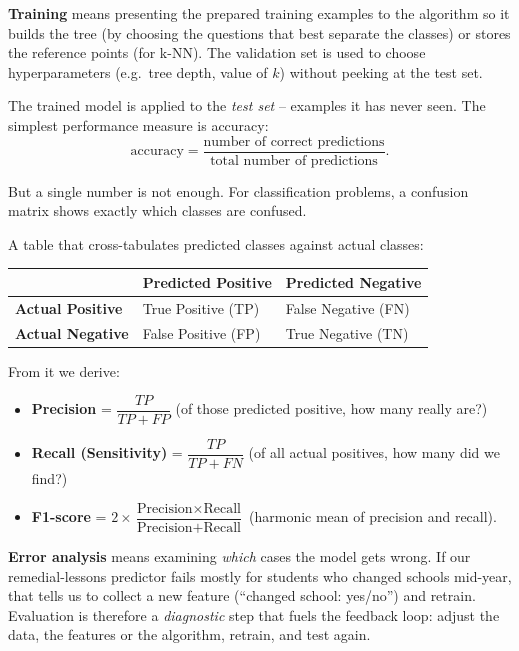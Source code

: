 \documentclass[11pt]{article}
\newcommand{\cle}[1]{{\popxbold\color{popdark}#1}}
\newcounter{popsec}
\newcounter{popsub}
\newcommand{\courssub}[1]{%
  \stepcounter{popsub}%
  \par\vspace{9pt}\noindent{\popxbold\fontsize{11.5}{13}\selectfont\color{popink}{\color{poporange}\thepopsec.\thepopsub}\hspace{6pt}#1}\par\nopagebreak\vspace{4pt}
}
\begin{document}
\textbf{Training} means presenting the prepared training examples to the algorithm so it builds the tree (by choosing the questions that best separate the classes) or stores the reference points (for k-NN). The validation set is used to choose hyperparameters (e.g.\ tree depth, value of $k$) without peeking at the test set.

\courssub{Stage 6: Testing and Evaluation}

The trained model is applied to the \emph{test set} -- examples it has never seen. The simplest performance measure is \cle{accuracy}:
\[ \text{accuracy} = \frac{\text{number of correct predictions}}{\text{total number of predictions}}. \]

But a single number is not enough. For classification problems, a \cle{confusion matrix} shows exactly which classes are confused.

\begin{definition}
A table that cross-tabulates predicted classes against actual classes:
\begin{center}
\begin{tabularx}{\linewidth}{|l|X|X|}
\hline
\rowcolor{popblueL} & \textbf{Predicted Positive} & \textbf{Predicted Negative} \\
\hline
\textbf{Actual Positive} & True Positive (TP) & False Negative (FN) \\
\hline
\textbf{Actual Negative} & False Positive (FP) & True Negative (TN) \\
\hline
\end{tabularx}
\end{center}
From it we derive:
\begin{itemize}
\item \textbf{Precision} = $\dfrac{TP}{TP+FP}$ (of those predicted positive, how many really are?)
\item \textbf{Recall (Sensitivity)} = $\dfrac{TP}{TP+FN}$ (of all actual positives, how many did we find?)
\item \textbf{F1-score} = $2 \times \dfrac{\text{Precision} \times \text{Recall}}{\text{Precision} + \text{Recall}}$ (harmonic mean of precision and recall).
\end{itemize}
\end{definition}

\textbf{Error analysis} means examining \emph{which} cases the model gets wrong. If our remedial-lessons predictor fails mostly for students who changed schools mid-year, that tells us to collect a new feature (``changed school: yes/no'') and retrain. Evaluation is therefore a \emph{diagnostic} step that fuels the feedback loop: adjust the data, the features or the algorithm, retrain, and test again.
\end{document}
